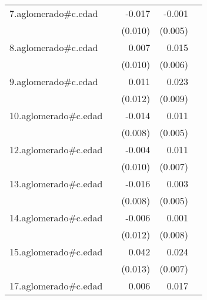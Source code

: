 {\begin{longtable}{l*{4}{D{.}{.}{-1}}}
\addlinespace
7.aglomerado#c.edad&                     &      -0.017         &      -0.001         &                     \\
            &                     &     (0.010)         &     (0.005)         &                     \\
\addlinespace
8.aglomerado#c.edad&                     &       0.007         &       0.015\sym{**} &                     \\
            &                     &     (0.010)         &     (0.006)         &                     \\
\addlinespace
9.aglomerado#c.edad&                     &       0.011         &       0.023\sym{*}  &                     \\
            &                     &     (0.012)         &     (0.009)         &                     \\
\addlinespace
10.aglomerado#c.edad&                     &      -0.014         &       0.011\sym{*}  &                     \\
            &                     &     (0.008)         &     (0.005)         &                     \\
\addlinespace
12.aglomerado#c.edad&                     &      -0.004         &       0.011         &                     \\
            &                     &     (0.010)         &     (0.007)         &                     \\
\addlinespace
13.aglomerado#c.edad&                     &      -0.016\sym{*}  &       0.003         &                     \\
            &                     &     (0.008)         &     (0.005)         &                     \\
\addlinespace
14.aglomerado#c.edad&                     &      -0.006         &       0.001         &                     \\
            &                     &     (0.012)         &     (0.008)         &                     \\
\addlinespace
15.aglomerado#c.edad&                     &       0.042\sym{**} &       0.024\sym{**} &                     \\
            &                     &     (0.013)         &     (0.007)         &                     \\
\addlinespace
17.aglomerado#c.edad&                     &       0.006         &       0.017\sym{*}  &                     \\

\end{longtable}}
